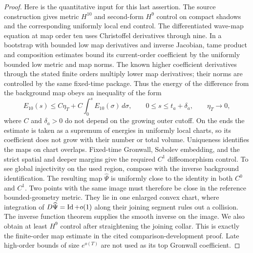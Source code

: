 \begin{proof}
Here is the quantitative input for this last assertion. The source
construction gives metric $H^{10}$ and second-form $H^9$ control on
compact shadows and the corresponding uniformly local end control.
The differentiated wave-map equation at map order ten uses
Christoffel derivatives through nine. In a bootstrap with bounded
low map derivatives and inverse Jacobian, tame product and composition
estimates bound its current-order coefficient by the uniformly bounded
low metric and map norms. The known higher coefficient derivatives
through the stated finite orders multiply lower map derivatives; their
norms are controlled by the same fixed-time package. Thus the energy
of the difference from the background map obeys an inequality of the
form
\begin{equation}\label{attach:map-estimate}
 E_{10}(s)\le C\eta_T+C\int_0^s E_{10}(\sigma)\,d\sigma,
 \qquad 0\le s\le t_a+\delta_a,
 \qquad \eta_T\longrightarrow0,
\end{equation}
where $C$ and $\delta_a>0$ do not depend on the growing outer cutoff.
On the ends the estimate is taken as a supremum of energies in
uniformly local charts, so its coefficient does not grow with their
number or total volume. Uniqueness identifies the maps on chart
overlaps. Fixed-time Gronwall, Sobolev embedding, and the strict
spatial and deeper margins give the required $C^1$ diffeomorphism
control. To see global injectivity on the used region, compose with
the inverse background identification. The resulting map $\widehat\Psi$ is
uniformly close to the identity in both $C^0$ and $C^1$. Two points
with the same image must therefore be close in the reference
bounded-geometry metric. They lie in one enlarged convex chart,
where integration of $D\widehat\Psi=\operatorname{Id}+o(1)$ along their joining segment
rules out a collision. The inverse function theorem supplies the
smooth inverse on the image. We also obtain at least $H^9$ control
after straightening the joining
collar. This is exactly the finite-order map estimate in the cited
comparison-development proof. Late high-order bounds of size
$e^{o(T)}$ are not used as its top Gronwall coefficient.


\end{proof}
